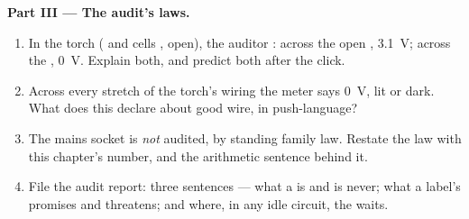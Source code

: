 \begin{problem}
\medskip\noindent\textbf{Part III --- The audit's laws.}
\begin{enumerate}[resume]
  \item In the torch ( and cells ,  open),
        the auditor : across the open ,
        \qty{3.1}{V}; across the , \qty{0}{V}. Explain
        both, and predict both after the click.
  \item Across every stretch of the torch's wiring the meter
        says \qty{0}{V}, lit or dark. What does this declare
        about good wire, in push-language?
  \item The mains socket is \emph{not} audited, by standing
        family law. Restate the law with this chapter's
        number, and the arithmetic sentence behind it.
  \item File the audit report: three sentences --- what a
         is and is never; what a label's  promises and threatens; and where, in any
        idle circuit, the  waits.
\end{enumerate}
\end{problem}
